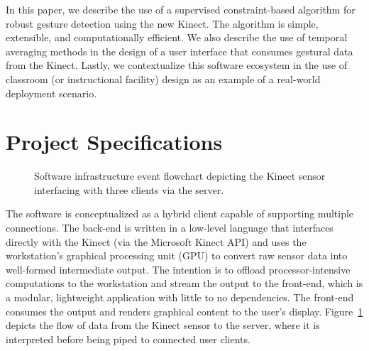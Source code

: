 \documentclass{scrartcl}
\numberwithin{equation}{section}
\begin{document}
    In this paper, we describe the use of a supervised constraint-based algorithm for robust gesture detection using the new Kinect. The algorithm is simple, extensible, and computationally efficient. We also describe the use of temporal averaging methods in the design of a user interface that consumes gestural data from the Kinect. Lastly, we contextualize this software ecosystem in the use of classroom (or instructional facility) design as an example of a real-world deployment scenario.
  \section{Project Specifications}
    \begin{figure}[ht!]
      \centering
      \caption{Software infrastructure event flowchart depicting the Kinect sensor interfacing with three clients via the server.\label{fig:pipeline}}
    \end{figure}
    The software is conceptualized as a hybrid client capable of supporting multiple connections. The back-end is written in a low-level language that interfaces directly with the Kinect (via the Microsoft Kinect API) and uses the workstation's graphical processing unit (GPU) to convert raw sensor data into well-formed intermediate output. The intention is to offload processor-intensive computations to the workstation and stream the output to the front-end, which is a modular, lightweight application with little to no dependencies. The front-end consumes the output and renders graphical content to the user's display. Figure~\ref{fig:pipeline} depicts the flow of data from the Kinect sensor to the server, where it is interpreted before being piped to connected user clients.
\end{document}
